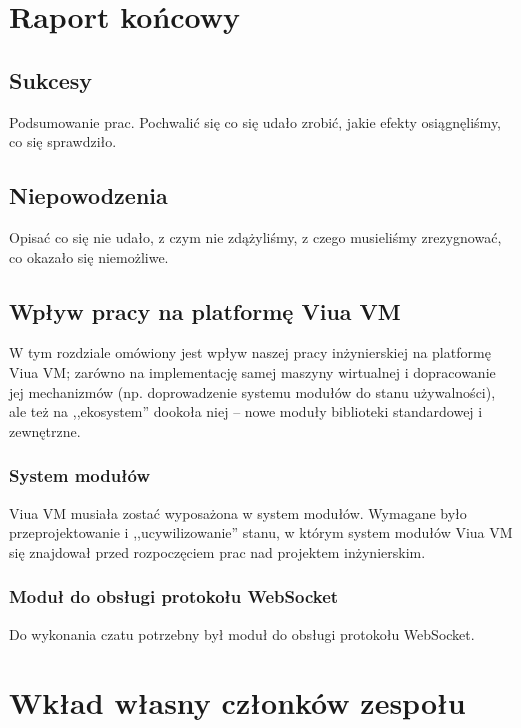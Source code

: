 \documentclass[11pt,oneside,a4paper,titlepage,onecolumn]{book}
\begin{document}


\chapter{Raport końcowy}

\section{Sukcesy}

Podsumowanie prac.
Pochwalić się co się udało zrobić, jakie efekty osiągnęliśmy, co się sprawdziło.

\section{Niepowodzenia} %

Opisać co się nie udało, z czym nie zdążyliśmy, z czego musieliśmy zrezygnować, co okazało się niemożliwe.

\section{Wpływ pracy na platformę Viua VM}

W tym rozdziale omówiony jest wpływ naszej pracy inżynierskiej na platformę Viua VM; zarówno na implementację
samej maszyny wirtualnej i dopracowanie jej mechanizmów (np. doprowadzenie systemu modułów do stanu
używalności), ale też na ,,ekosystem'' dookoła niej -- nowe moduły biblioteki standardowej i zewnętrzne.

\subsection{System modułów}

Viua VM musiała zostać wyposażona w system modułów. Wymagane było przeprojektowanie i ,,ucywilizowanie''
stanu, w którym system modułów Viua VM się znajdował przed rozpoczęciem prac nad projektem inżynierskim.

\subsection{Moduł do obsługi protokołu WebSocket}

Do wykonania czatu potrzebny był moduł do obsługi protokołu WebSocket.

\chapter{Wkład własny członków zespołu}
\label{wklad_wlasny_czlonkow_zespolu}
\end{document}
